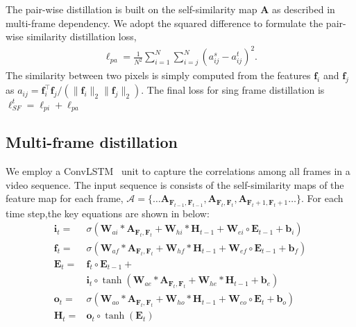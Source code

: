 \documentclass[runningheads]{llncs}
\begin{document}
The pair-wise distillation is built on the self-similarity map $\mathbf{A}$ as described in multi-frame dependency. We adopt the squared difference to formulate the pair-wise similarity distillation loss,
\begin{align}
\ell_{pa} = \frac{1}{N^2}
\sum_{i=1}^{N} \sum_{i=j}^{N}
(a^s_{ij} - a^t_{ij})^2.
\end{align}
The similarity between two pixels is simply computed
from the features $\mathbf{f}_i$
and $\mathbf{f}_j$
as $a_{ij} = {\mathbf{f}_i^\top \mathbf{f}_j}/{(\|\mathbf{f}_i\|_2\|\mathbf{f}_j\|_2)}.$
The final loss for sing frame distillation is $\ell_{SF}^t=\ell_{pi}+\ell_{pa}$
\subsection{Multi-frame distillation}
We employ a ConvLSTM~\cite{ConvLSTM} unit to capture the correlations among all frames in a video sequence. The input sequence is consists of the self-similarity maps of the feature map for each frame, $\mathcal{A}=\{\dots \mathbf{A}_{\mathbf{F}_{t-1},\mathbf{F}_{t-1}},\mathbf{A}_{\mathbf{F}_t,\mathbf{F}_t},\mathbf{A}_{\mathbf{F}_t+1,\mathbf{F}_t+1}\dots\}$. For each time step,the key equations are shown in below:
\begin{equation}
\begin{aligned}
\mathbf{i}_t =& \sigma(\mathbf{W}_{ai}\ast \mathbf{A}_{\mathbf{F}_t,\mathbf{F}_t} + \mathbf{W}_{hi}\ast \mathbf{H}_{t-1} + \mathbf{W}_{ei}\circ \mathbf{E}_{t-1} + \mathbf{b}_i) \\
\mathbf{f}_t =& \sigma(\mathbf{W}_{af}\ast\mathbf{A}_{\mathbf{F}_t,\mathbf{F}_t} + \mathbf{W}_{hf}\ast \mathbf{H}_{t-1} + \mathbf{W}_{ef}\circ \mathbf{E}_{t-1}+\mathbf{b}_f) \\
\mathbf{E}_t = &\mathbf{f}_t \circ \mathbf{E}_{t-1} + \\
&\mathbf{i}_t \circ \tanh(\mathbf{W}_{ae} \ast \mathbf{A}_{\mathbf{F}_t,\mathbf{F}_t} + \mathbf{W}_{he} \ast \mathbf{H}_{t-1}+\mathbf{b}_e) \\
\mathbf{o}_t =& \sigma(\mathbf{W}_{ao}\ast \mathbf{A}_{\mathbf{F}_t,\mathbf{F}_t}  +\mathbf{W}_{ho}\ast \mathbf{H}_{t-1} + \mathbf{W}_{eo}\circ \mathbf{E}_{t}  +\mathbf{b}_o) \\
\mathbf{H}_t = &\mathbf{o}_t \circ \tanh({\mathbf{E}_t})
\end{aligned}
\label{eq:convlstm}
\end{equation}
\end{document}
